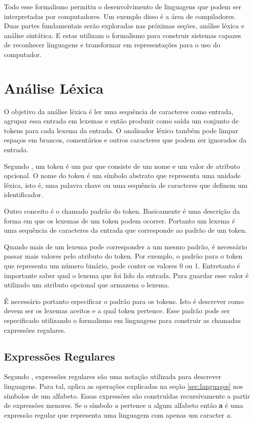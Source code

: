 Todo esse formalismo permitiu o desenvolvimento de linguagens que podem ser interpretadas por computadores.
Um exemplo disso é a área de compiladores. Duas partes fundamentais serão exploradas nas próximas
seções, análise léxica e análise sintática. E estas utilizam o formalismo para construir sistemas capazes 
de reconhecer linguagens e transformar em representações para o uso do computador.

\section{Análise Léxica}

O objetivo da análise léxica é ler uma sequência de caracteres como entrada, agrupar essa entrada em lexemas e então
produzir como saída um conjunto de tokens para cada lexema da entrada. O analisador léxico
também pode limpar espaços em brancos, comentários e outros caracteres que podem ser ignorados da entrada.

Segundo , um token é um par que consiste de um nome e um valor de atributo opcional.
O nome do token é um símbolo abstrato que representa uma unidade léxica, isto é, uma  palavra chave ou
uma sequência de caracteres que definem um identificador.

Outro conceito é o chamado padrão do token. Basicamente é uma descrição da forma em que os lexemas de
um token podem ocorrer. Portanto um lexema é uma sequência de caracteres da entrada que 
corresponde ao padrão de um token.

Quando mais de um lexema pode corresponder a um mesmo padrão, é necessário passar mais valores 
pelo atributo do token. Por exemplo, o padrão para o token que representa um número binário, pode conter
os valores 0 ou 1. Entretanto é importante saber qual o lexema que foi lido da entrada. Para guardar esse valor 
é utilizado um atributo opcional que armazena o lexema.

É necessário portanto especificar o padrão para os tokens. Isto é descrever como devem ser os lexemas aceitos e 
a qual token pertence.
Esse padrão pode ser especificado utilizando o formalismo em linguagens para construir as chamadas 
expressões regulares.

\subsection{Expressões Regulares}

Segundo , expressões regulares são uma notação utilizada para descrever linguagens.
Para tal, aplica as operações explicadas na seção \ref{sec:languages} nos símbolos de um alfabeto.
Essas expressões são construídas recursivamente a partir de expressões menores. Se o símbolo 
\textit{a} pertence a algum alfabeto então \textbf{a} é uma expressão regular que representa uma
linguagem com apenas um caracter \textit{a}.


